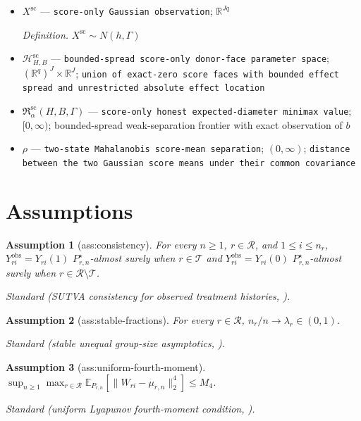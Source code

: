 \documentclass{article}
\newtheorem{assumption}{Assumption}
\begin{document}
\begin{itemize}
  \item \(X^{\mathrm{sc}}\) --- \texttt{score-\allowbreak{}only Gaussian observation}; \(\mathbb R^{Jq}\)
  \par\smallskip\noindent\emph{Definition.} \(X^{\mathrm{sc}}\sim N(h,\Gamma)\)
  \item \(\mathcal H_{H,B}^{\mathrm{sc}}\) --- \texttt{bounded-\allowbreak{}spread score-\allowbreak{}only donor-\allowbreak{}face parameter space}; \((\mathbb R^q)^J\times\mathbb R^J\); \texttt{union of exact-\allowbreak{}zero score faces with bounded effect spread and unrestricted absolute effect location}
  \item \(\mathfrak R_{\alpha}^{\mathrm{sc}}(H,B,\Gamma)\) --- \texttt{score-\allowbreak{}only honest expected-\allowbreak{}diameter minimax value}; \([0,\infty)\); bounded-spread weak-separation frontier with exact observation of \(b\)
  \item \(\rho\) --- \texttt{two-\allowbreak{}state Mahalanobis score-\allowbreak{}mean separation}; \((0,\infty)\); \texttt{distance between the two Gaussian score means under their common covariance}
\end{itemize}

\section{Assumptions}

\begin{assumption}[ass:consistency]\label{ass:consistency}
For every \(n\ge1\), \(r\in\mathcal R\), and \(1\le i\le n_r\), \(Y_{ri}^{\mathrm{obs}}=Y_{ri}(1)\) \(P_{r,n}^{\star}\)-almost surely when \(r\in\mathcal T\) and \(Y_{ri}^{\mathrm{obs}}=Y_{ri}(0)\) \(P_{r,n}^{\star}\)-almost surely when \(r\in\mathcal R\setminus\mathcal T\).
\par\smallskip\noindent\emph{Standard} (SUTVA consistency for observed treatment histories, \cite{ImbensRubin2015}).
\end{assumption}

\begin{assumption}[ass:stable-fractions]\label{ass:stable-fractions}
For every \(r\in\mathcal R\), \(n_r/n\to\lambda_r\in(0,1)\).
\par\smallskip\noindent\emph{Standard} (stable unequal group-size asymptotics, \cite{FermanPinto2019}).
\end{assumption}

\begin{assumption}[ass:uniform-fourth-moment]\label{ass:uniform-fourth-moment}
\(\sup_{n\ge1}\max_{r\in\mathcal R}\mathbb E_{P_{r,n}}[\|W_{ri}-\mu_{r,n}\|_2^4]\le M_4\).
\par\smallskip\noindent\emph{Standard} (uniform Lyapunov fourth-moment condition, \cite{vanDerVaart1998}).
\end{assumption}
\end{document}
